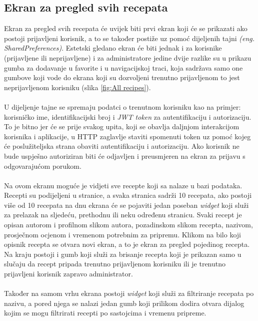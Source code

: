 \documentclass[times, utf8, zavrsni]{fer}
\begin{document}
\subsection{Ekran za pregled svih recepata}
Ekran za pregled svih recepata će uvijek biti prvi ekran koji će se prikazati ako postoji
prijavljeni korisnik, a to se također postiže uz pomoć dijeljenih tajni \textit{(eng. SharedPreferences)}.
Estetski gledano ekran će biti jednak i za korisnike (prijavljene ili neprijavljene) i za administratore jedine dvije
razlike su u prikazu gumba za dodavanje u favorite i
u navigacijskoj traci, koja sadržava samo one gumbove koji vode do ekrana koji su dozvoljeni
trenutno prijavljenom to jest neprijavljenom korisniku (slika \ref{fig:All recipes}).
\\\\
U dijeljenje tajne se spremaju podatci o trenutnom korisniku kao na primjer: korisničko ime, identifikacijski
broj i \textit{JWT token} za autentifikaciju i autorizaciju.
To je bitno jer će se prije svakog upita, koji se obavlja daljnjom interakcijom
korisnika i aplikacije, u HTTP zaglavlje staviti spomenuti token uz pomoć kojeg će
poslužiteljska strana obaviti autentifikaciju i autorizaciju. Ako korisnik ne bude uspješno
autoriziran biti će odjavljen i preusmjeren na ekran za prijavu s odgovarajućom porukom.
\\\\
Na ovom ekranu moguće je vidjeti sve recepte koji sa nalaze u bazi podataka. Recepti su podijeljeni u stranice,
a svaka stranica sadrži 10 recepata, ako postoji više od 10 recepata na dnu ekrana će se pojaviti
jedan poseban \textit{widget} koji služi za prelazak na sljedeću, prethodnu ili neku određenu stranicu.
Svaki recept je opisan autorom i profilnom slikom autora, pozadinskom slikom recepta, nazivom,
prosječnom ocjenom i vremenom potrebnim za pripremu. Klikom na bilo koji opisnik recepta se otvara novi ekran,
a to je ekran za pregled pojedinog recepta. Na kraju postoji i gumb koji služi za brisanje recepta koji
je prikazan samo u slučaju da recept pripada trenutno prijavljenom korisniku ili je trenutno prijavljeni
korisnik zapravo administrator.
\\\\
Također na samom vrhu ekrana postoji \textit{widget} koji služi za filtriranje recepata po nazivu,
a pored njega se nalazi jedan gumb koji prilikom dodira otvara dijalog kojim
se mogu filtrirati recepti po sastojcima i vremenu pripreme.
\end{document}

